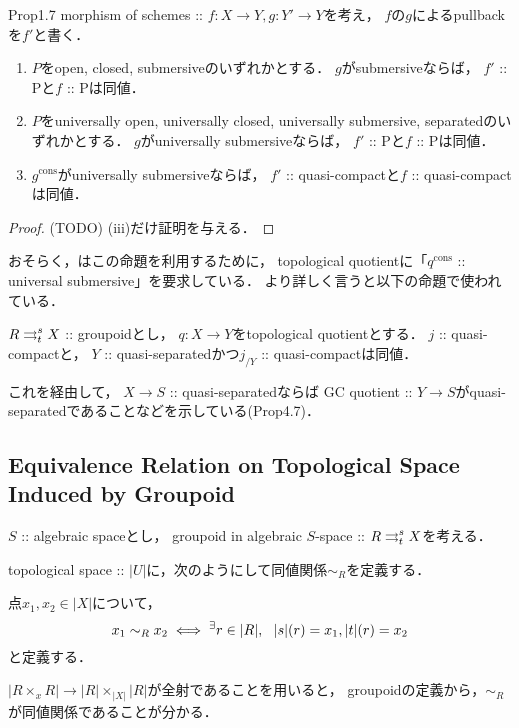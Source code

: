 \documentclass[a4paper, dvipdfmx]{jsarticle}
\newcommand{\cons}{\mathrm{cons}}
\begin{document}
\begin{Prop}{\cite{Rydh10} Prop1.7} \label{refrecting_property_of_pullback}
    morphism of schemes :: $f \colon X \to Y, g \colon Y' \to Y$を考え，
    $f$の$g$によるpullbackを$f'$と書く．
    \begin{enumerate}
    \item 
        $P$をopen, closed, submersiveのいずれかとする．
        $g$がsubmersiveならば，
        $f'$ :: Pと$f$ :: Pは同値．
    \item 
        $P$をuniversally open, universally closed, universally submersive, separatedのいずれかとする．
        $g$がuniversally submersiveならば，
        $f'$ :: Pと$f$ :: Pは同値．
    \item 
        $g^{\cons}$がuniversally submersiveならば，
        $f'$ :: quasi-compactと$f$ :: quasi-compactは同値．
    \end{enumerate}
\end{Prop}
\begin{proof}
    (TODO)
    (iii)だけ証明を与える．
\end{proof}

\begin{Remark}
    おそらく，\cite{Rydh13}はこの命題を利用するために，
    topological quotientに「$q^{\cons}$ :: universal submersive」を要求している．
    より詳しく言うと以下の命題で使われている．
    \begin{Prop}
        $R \mathrel{\mathop{\rightrightarrows}^{s}_{t}} X$ :: groupoidとし，
        $q \colon X \to Y$をtopological quotientとする．
        $j$ :: quasi-compactと，
        $Y$ :: quasi-separatedかつ$j_{/Y}$ :: quasi-compactは同値．
    \end{Prop}
    これを経由して，
    $X \to S$ :: quasi-separatedならば
    GC quotient :: $Y \to S$がquasi-separatedであることなどを示している(Prop4.7)．
\end{Remark}

\subsection{Equivalence Relation on Topological Space Induced by Groupoid}
$S$ :: algebraic spaceとし，
groupoid in algebraic $S$-space :: $R \mathrel{\mathop{\rightrightarrows}^{s}_{t}} X$を考える．

topological space :: $|U|$に，次のようにして同値関係$\sim_{R}$を定義する．
\begin{Def}
    点$x_1, x_2 \in |X|$について，
    \[ x_1 \sim_R x_2 \iff {}^{\exists} r \in |R|,~~ |s|(r)=x_1, |t|(r)=x_2 \]
    と定義する．
\end{Def}
$|R \times_{x} R| \to |R| \times_{|X|} |R|$が全射であることを用いると，
groupoidの定義から，$\sim_R$が同値関係であることが分かる．
\end{document}
